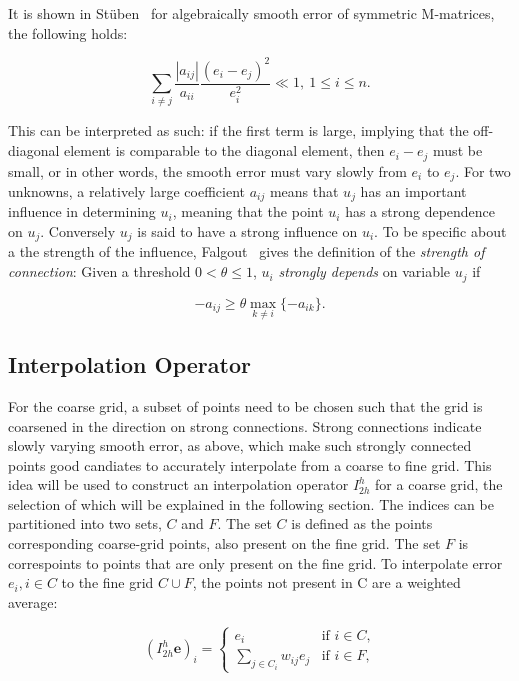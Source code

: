 It is shown in Stüben~\cite{Stuben1999} for algebraically smooth error of symmetric M-matrices, the following holds:

\begin{equation}
	\sum_{i \neq j}{\frac{|a_{ij}|}{a_{ii}}\frac{(e_i - e_j)^2}{e_i^2}} \ll 1,\ 1 \leq i \leq n.
	\label{eq:strong_connection}
\end{equation}

This can be interpreted as such: if the first term is large, implying that the off-diagonal element is comparable to the diagonal element, then $e_i - e_j$ must be small, or in other words, the smooth error must vary slowly from $e_i$ to $e_j$. For two unknowns, a relatively large coefficient $a_{ij}$ means that $u_j$ has an important influence in determining $u_i$, meaning that the point $u_i$ has a strong dependence on $u_j$. Conversely $u_j$ is said to have a strong influence on $u_i$. To be specific about a the strength of the influence, Falgout~\cite{Falgout2006} gives the definition of the \emph{strength of connection}: Given a threshold $0 < \theta \leq 1$, $u_i$ \emph{strongly depends} on variable $u_j$ if

\begin{equation}
-a_{ij} \geq \theta \max_{k \neq i}{\{-a_{ik}\}}.
\label{eq:strong_connection2}
\end{equation}

\subsection{Interpolation Operator} %

For the coarse grid, a subset of points need to be chosen such that the grid is coarsened in the direction on strong connections. Strong connections indicate slowly varying smooth error, as above, which make such strongly connected points good candiates to accurately interpolate from a coarse to fine grid. This idea will be used to construct an interpolation operator $I_{2h}^h$ for a coarse grid, the selection of which will be explained in the following section. The indices can be partitioned into two sets, $C$ and $F$. The set $C$ is defined as the points corresponding coarse-grid points, also present on the fine grid. The set $F$ is correspoints to points that are only present on the fine grid. To interpolate error $e_i, i \in C$ to the fine grid $C \cup F$, the points not present in C are a weighted average:

\begin{equation}
	(I_{2h}^h\mathbf{e})_i =
		\begin{cases}
			e_i & \text{if $i \in C$,} \\
			\displaystyle \sum_{j \in C_i}{w_{ij}e_j} & \text{if $i \in F$,}
		\end{cases}
	\label{eq:interpolation_operator}
\end{equation}

